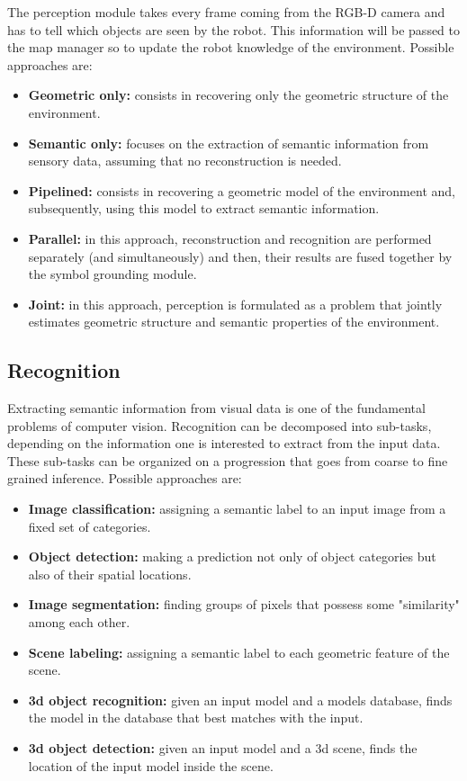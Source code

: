 \documentclass{article}
\begin{document}
	The perception module takes every frame coming from the RGB-D camera and has to tell which objects are seen by the robot. This information will be passed to the map manager so to update the robot knowledge of the environment. Possible approaches are:
		
	\begin{itemize}
		\item {\bf Geometric only:} consists in recovering only the geometric structure of the environment.
		\item {\bf Semantic only:} focuses on the extraction of semantic information from sensory data, assuming that no reconstruction is needed.
		\item {\bf Pipelined:} consists in recovering a geometric model of the environment and, subsequently, using this model to extract semantic information.
		\item {\bf Parallel:} in this approach, reconstruction and recognition are performed separately (and simultaneously) and then, their results are fused together by the symbol grounding module.
		\item {\bf Joint:} in this approach, perception is formulated as a problem that jointly estimates geometric structure and semantic properties of the environment. 
	\end{itemize}
	
	\subsection{Recognition}
	
	Extracting semantic information from visual data is one of the  fundamental problems of computer vision. Recognition can be decomposed into sub-tasks, depending on the information one is interested to extract from the input data. These sub-tasks can be organized on a progression that goes from coarse to fine grained inference. Possible approaches are:
	
	\begin{itemize}
		\item {\bf Image classification:} assigning a semantic label to an input image from a fixed set of categories.
		\item {\bf Object detection:} making a prediction not only of object categories but also of their spatial locations.
		\item {\bf Image segmentation:} finding groups of pixels that possess some "similarity" among each other.
		\item {\bf Scene labeling:} assigning a semantic label to each geometric feature of the scene.
		\item {\bf 3d object recognition:} given an input model and a models database, finds the model in the database that best matches with the input.
		\item {\bf 3d object detection:} given an input model and a 3d scene, finds the location of the input model inside the scene.
	\end{itemize}
	
\end{document}
